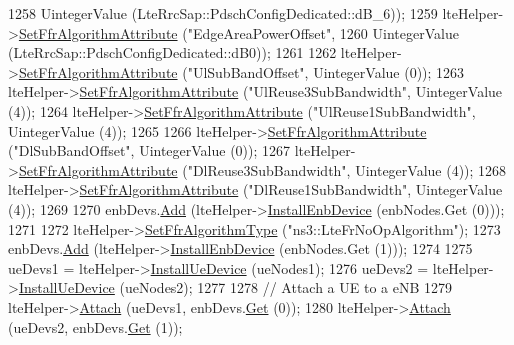\begin{DoxyCode}
1258                                        UintegerValue (LteRrcSap::PdschConfigDedicated::dB\_6));
1259   lteHelper->\hyperlink{classns3_1_1LteHelper_a793d56e843a844428851e90752c5f130}{SetFfrAlgorithmAttribute} (\textcolor{stringliteral}{"EdgeAreaPowerOffset"},
1260                                        UintegerValue (LteRrcSap::PdschConfigDedicated::dB0));
1261 
1262   lteHelper->\hyperlink{classns3_1_1LteHelper_a793d56e843a844428851e90752c5f130}{SetFfrAlgorithmAttribute} (\textcolor{stringliteral}{"UlSubBandOffset"}, UintegerValue (0));
1263   lteHelper->\hyperlink{classns3_1_1LteHelper_a793d56e843a844428851e90752c5f130}{SetFfrAlgorithmAttribute} (\textcolor{stringliteral}{"UlReuse3SubBandwidth"}, UintegerValue (4));
1264   lteHelper->\hyperlink{classns3_1_1LteHelper_a793d56e843a844428851e90752c5f130}{SetFfrAlgorithmAttribute} (\textcolor{stringliteral}{"UlReuse1SubBandwidth"}, UintegerValue (4));
1265 
1266   lteHelper->\hyperlink{classns3_1_1LteHelper_a793d56e843a844428851e90752c5f130}{SetFfrAlgorithmAttribute} (\textcolor{stringliteral}{"DlSubBandOffset"}, UintegerValue (0));
1267   lteHelper->\hyperlink{classns3_1_1LteHelper_a793d56e843a844428851e90752c5f130}{SetFfrAlgorithmAttribute} (\textcolor{stringliteral}{"DlReuse3SubBandwidth"}, UintegerValue (4));
1268   lteHelper->\hyperlink{classns3_1_1LteHelper_a793d56e843a844428851e90752c5f130}{SetFfrAlgorithmAttribute} (\textcolor{stringliteral}{"DlReuse1SubBandwidth"}, UintegerValue (4));
1269 
1270   enbDevs.\hyperlink{classns3_1_1NetDeviceContainer_a7ca8bc1d7ec00fd4fcc63869987fbda5}{Add} (lteHelper->\hyperlink{classns3_1_1LteHelper_a5e009ad35ef85f46b5a6099263f15a03}{InstallEnbDevice} (enbNodes.Get (0)));
1271 
1272   lteHelper->\hyperlink{classns3_1_1LteHelper_a035c6b03305c1511975362f80425b5fc}{SetFfrAlgorithmType} (\textcolor{stringliteral}{"ns3::LteFrNoOpAlgorithm"});
1273   enbDevs.\hyperlink{classns3_1_1NetDeviceContainer_a7ca8bc1d7ec00fd4fcc63869987fbda5}{Add} (lteHelper->\hyperlink{classns3_1_1LteHelper_a5e009ad35ef85f46b5a6099263f15a03}{InstallEnbDevice} (enbNodes.Get (1)));
1274 
1275   ueDevs1 = lteHelper->\hyperlink{classns3_1_1LteHelper_ac9cd932d7de92811cfa953c2e3b2fc9f}{InstallUeDevice} (ueNodes1);
1276   ueDevs2 = lteHelper->\hyperlink{classns3_1_1LteHelper_ac9cd932d7de92811cfa953c2e3b2fc9f}{InstallUeDevice} (ueNodes2);
1277 
1278   \textcolor{comment}{// Attach a UE to a eNB}
1279   lteHelper->\hyperlink{classns3_1_1LteHelper_a9466743f826aa2652a87907b7f0a1c87}{Attach} (ueDevs1, enbDevs.\hyperlink{classns3_1_1NetDeviceContainer_a677d62594b5c9d2dea155cc5045f4d0b}{Get} (0));
1280   lteHelper->\hyperlink{classns3_1_1LteHelper_a9466743f826aa2652a87907b7f0a1c87}{Attach} (ueDevs2, enbDevs.\hyperlink{classns3_1_1NetDeviceContainer_a677d62594b5c9d2dea155cc5045f4d0b}{Get} (1));

\end{DoxyCode}
